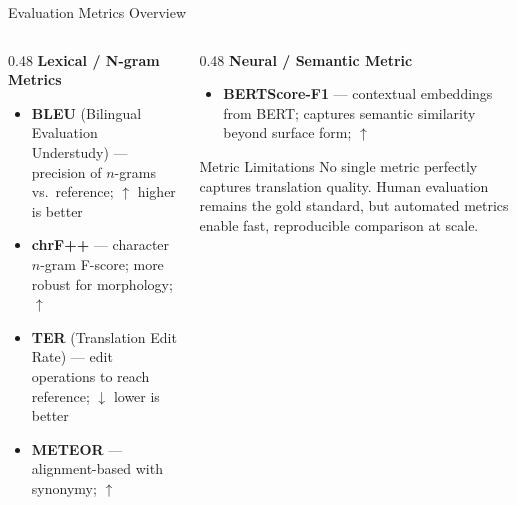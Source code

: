 \documentclass[aspectratio=169]{beamer}
\begin{document}
\begin{frame}{Evaluation Metrics Overview}
  \begin{columns}[T]
    \begin{column}{0.48\textwidth}
      \textbf{Lexical / N-gram Metrics}
      \vspace{0.2cm}
      \begin{itemize}
        \item \textbf{BLEU} (Bilingual Evaluation Understudy) --- precision of $n$-grams vs.\ reference; \textcolor{mtgreen}{$\uparrow$ higher is better}
        \item \textbf{chrF++} --- character $n$-gram F-score; more robust for morphology; \textcolor{mtgreen}{$\uparrow$}
        \item \textbf{TER} (Translation Edit Rate) --- edit operations to reach reference; \textcolor{mtred}{$\downarrow$ lower is better}
        \item \textbf{METEOR} --- alignment-based with synonymy; \textcolor{mtgreen}{$\uparrow$}
      \end{itemize}
    \end{column}
    \begin{column}{0.48\textwidth}
      \textbf{Neural / Semantic Metric}
      \vspace{0.2cm}
      \begin{itemize}
        \item \textbf{BERTScore-F1} --- contextual embeddings from BERT; captures semantic similarity beyond surface form; \textcolor{mtgreen}{$\uparrow$}
      \end{itemize}
      \vspace{0.4cm}
      \begin{alertblock}{Metric Limitations}
        No single metric perfectly captures translation quality. Human evaluation remains the gold standard, but automated metrics enable fast, reproducible comparison at scale.
      \end{alertblock}
    \end{column}
  \end{columns}
\end{frame}
\end{document}
